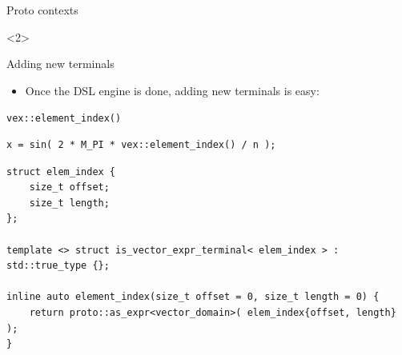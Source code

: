 \documentclass[@BEAMER_OPTIONS@]{beamer}
\newcommand{\code}[1]{\lstinline|#1|}
\begin{document}
\begin{frame}[fragile]{Proto contexts}
\begin{onlyenv}
    \end{onlyenv}
    \begin{onlyenv}<2>
    \end{onlyenv}
\end{frame}

\begin{frame}[fragile]{Adding new terminals}
    \begin{itemize}
        \item Once the DSL engine is done, adding new terminals is easy:
    \end{itemize}
    \begin{exampleblock}{\code{vex::element_index()}}
        \begin{lstlisting}
x = sin( 2 * M_PI * vex::element_index() / n );
        \end{lstlisting}
    \end{exampleblock}
    \begin{exampleblock}{}
        \begin{lstlisting}
struct elem_index {
    size_t offset;
    size_t length;
};

template <> struct is_vector_expr_terminal< elem_index > : std::true_type {};

inline auto element_index(size_t offset = 0, size_t length = 0) {
    return proto::as_expr<vector_domain>( elem_index{offset, length} );
}
        \end{lstlisting}
    \end{exampleblock}
\end{frame}

\note{ }
\end{document}
